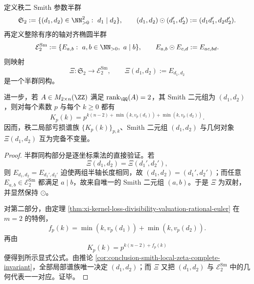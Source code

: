 \begin{theorem}\label{thm:conclusion-smith-ranktwo-divisibility-ellipse-semigroup}
定义秩二 Smith 参数半群
\[
\mathfrak S_2
:=
\{(d_1,d_2)\in\NN_{>0}^2:\ d_1\mid d_2\},
\qquad
(d_1,d_2)\odot(d_1',d_2'):=(d_1d_1',d_2d_2').
\]
再定义整除有序的轴对齐椭圆半群
\[
\mathcal E_2^{\mathrm{Sm}}
:=
\{E_{a,b}:\ a,b\in\NN_{>0},\ a\mid b\},
\qquad
E_{a,b}\odot E_{c,d}:=E_{ac,bd}.
\]
则映射
\[
\Xi:\mathfrak S_2\to \mathcal E_2^{\mathrm{Sm}},
\qquad
\Xi(d_1,d_2):=E_{d_1,d_2}
\]
是一个半群同构。

进一步，若 \(A\in M_{2\times n}(\ZZ)\) 满足 \(\operatorname{rank}_{\QQ}(A)=2\)，其 Smith 二元组为 \((d_1,d_2)\)，则对每个素数 \(p\) 与每个 \(k\ge 0\) 都有
\[
K_p(k)
=
p^{k(n-2)+\min(k,v_p(d_1))+\min(k,v_p(d_2))}.
\]
因而，秩二局部亏损谱族 \(\{K_p(k)\}_{p,k}\)、Smith 二元组 \((d_1,d_2)\) 与几何对象 \(\Xi(d_1,d_2)\) 互为完备不变量。
\end{theorem}
\begin{proof}
半群同构部分是逐坐标乘法的直接验证。若
\[
\Xi(d_1,d_2)=\Xi(d_1',d_2'),
\]
则 \(E_{d_1,d_2}=E_{d_1',d_2'}\) 迫使两组半轴长度相同，故 \((d_1,d_2)=(d_1',d_2')\)；而任意 \(E_{a,b}\in\mathcal E_2^{\mathrm{Sm}}\) 都满足 \(a\mid b\)，故来自唯一的 Smith 二元组 \((a,b)\)。于是 \(\Xi\) 为双射，并显然保持 \(\odot\)。

对第二部分，由定理 \ref{thm:xi-kernel-loss-divisibility-valuation-rational-euler} 在 \(m=2\) 的特例，
\[
f_p(k)=\min(k,v_p(d_1))+\min(k,v_p(d_2)).
\]
再由
\[
K_p(k)=p^{k(n-2)+f_p(k)}
\]
便得到所示显式公式。由推论 \ref{cor:conclusion-smith-local-zeta-complete-invariant}，全部局部谱族唯一决定 \((d_1,d_2)\)；而 \(\Xi\) 又把 \((d_1,d_2)\) 与 \(\mathcal E_2^{\mathrm{Sm}}\) 中的几何代表一一对应。证毕。
\end{proof}

